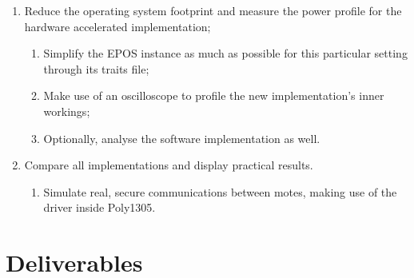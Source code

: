 \documentclass{../sftex/sftex}
\begin{document}
\begin{enumerate}
\begin{enumerate}
  \end{enumerate}
  \item Reduce the operating system footprint and measure the power profile
      for the hardware accelerated implementation;
  \begin{enumerate}
    \item Simplify the EPOS instance as much as possible for this particular
        setting through its traits file;
    \item Make use of an oscilloscope to profile the new implementation's
        inner workings;
    \item Optionally, analyse the software implementation as well.
  \end{enumerate}
  \item Compare all implementations and display practical results.
  \begin{enumerate}
    \item Simulate real, secure communications between motes, making use of
        the driver inside Poly1305.
  \end{enumerate}
\end{enumerate}

\section{Deliverables}
\end{document}
